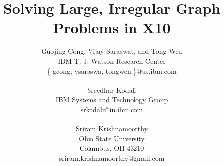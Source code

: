 \documentclass[12pt]{article}
\numberwithin{equation}{section}
\begin{document}
\title{Solving Large, Irregular Graph Problems in X10}

\author{Guojing Cong,  Vijay Saraswat, and Tong Wen\\
IBM T. J. Watson Research Center\\
 \{ gcong, vsaraswa, tongwen \}@us.ibm.com\\ 
\\
Sreedhar Kodali\\
IBM Systems and Technology Group\\
srkodali@in.ibm.com\\
\\
Sriram Krishnamoorthy \\
Ohio State University\\
Columbus, OH 43210 \\
sriram.krishnamoorthy@gmail.com\\
}

\maketitle
\thispagestyle{empty}













\end{document}
